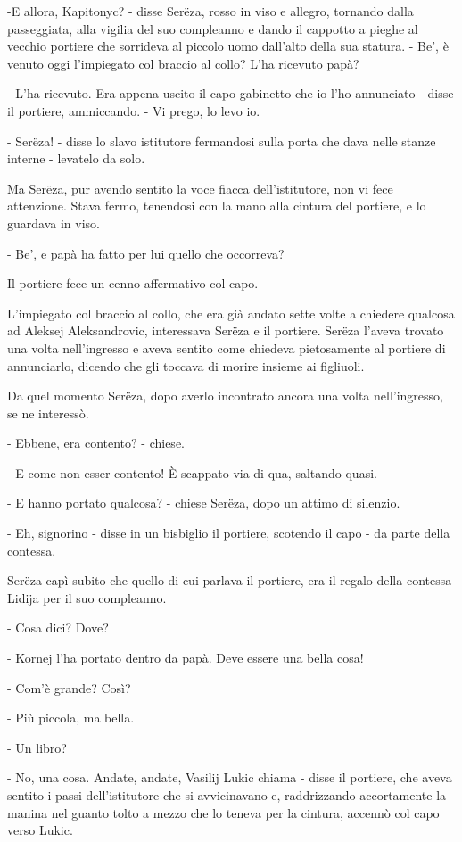 -E allora, Kapitonyc? - disse Serëza, rosso in viso e allegro, tornando dalla passeggiata, alla vigilia del suo compleanno e dando il cappotto a pieghe al vecchio portiere che sorrideva al piccolo uomo dall'alto della sua statura. - Be', è venuto oggi l'impiegato col braccio al collo? L'ha ricevuto papà? 

- L'ha ricevuto. Era appena uscito il capo gabinetto che io l'ho annunciato - disse il portiere, ammiccando. - Vi prego, lo levo io. 

- Serëza! - disse lo slavo istitutore fermandosi sulla porta che dava nelle stanze interne - levatelo da solo. 

Ma Serëza, pur avendo sentito la voce fiacca dell'istitutore, non vi fece attenzione. Stava fermo, tenendosi con la mano alla cintura del portiere, e lo guardava in viso. 

- Be', e papà ha fatto per lui quello che occorreva? 

Il portiere fece un cenno affermativo col capo. 

L'impiegato col braccio al collo, che era già andato sette volte a chiedere qualcosa ad Aleksej Aleksandrovic, interessava Serëza e il portiere. Serëza l'aveva trovato una volta nell'ingresso e aveva sentito come chiedeva pietosamente al portiere di annunciarlo, dicendo che gli toccava di morire insieme ai figliuoli. 

Da quel momento Serëza, dopo averlo incontrato ancora una volta nell'ingresso, se ne interessò. 

- Ebbene, era contento? - chiese. 

- E come non esser contento! È scappato via di qua, saltando quasi. 

- E hanno portato qualcosa? - chiese Serëza, dopo un attimo di silenzio. 

- Eh, signorino - disse in un bisbiglio il portiere, scotendo il capo - da parte della contessa. 

Serëza capì subito che quello di cui parlava il portiere, era il regalo della contessa Lidija per il suo compleanno. 

- Cosa dici? Dove? 

- Kornej l'ha portato dentro da papà. Deve essere una bella cosa! 

- Com'è grande? Così? 

- Più piccola, ma bella. 

- Un libro? 

- No, una cosa. Andate, andate, Vasilij Lukic chiama - disse il portiere, che aveva sentito i passi dell'istitutore che si avvicinavano e, raddrizzando accortamente la manina nel guanto tolto a mezzo che lo teneva per la cintura, accennò col capo verso Lukic. 

